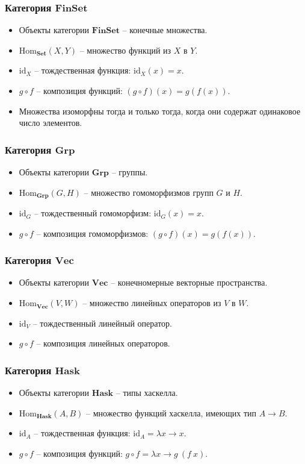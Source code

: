 \documentclass{beamer}
\newcommand{\cat}[1]{\mathbf{#1}}
\newcommand{\Set}{\cat{Set}}
\newcommand{\FinSet}{\cat{FinSet}}
\newcommand{\Grp}{\cat{Grp}}
\renewcommand{\Vec}{\cat{Vec}}
\newcommand{\Hask}{\cat{Hask}}
\newcommand{\fs}[1]{\mathrm{#1}}
\newcommand{\Hom}{\fs{Hom}}
\newcommand{\id}{\fs{id}}
\begin{document}
\begin{frame}
\frametitle{Категория $\FinSet$}
\begin{itemize}
\item Объекты категории $\FinSet$ -- конечные множества.
\item $\Hom_\Set(X, Y)$ -- множество функций из $X$ в $Y$.
\item $\id_X$ -- тождественная функция: $\id_X(x) = x$.
\item $g \circ f$ -- композиция функций: $(g \circ f)(x) = g(f(x))$.
\item Множества изоморфны тогда и только тогда, когда они содержат одинаковое число элементов.
\end{itemize}
\end{frame}

\begin{frame}
\frametitle{Категория $\Grp$}
\begin{itemize}
\item Объекты категории $\Grp$ -- группы.
\item $\Hom_\Grp(G, H)$ -- множество гомоморфизмов групп $G$ и $H$.
\item $\id_G$ -- тождественный гомоморфизм: $\id_G(x) = x$.
\item $g \circ f$ -- композиция гомоморфизмов: $(g \circ f)(x) = g(f(x))$.
\end{itemize}
\end{frame}

\begin{frame}
\frametitle{Категория $\Vec$}
\begin{itemize}
\item Объекты категории $\Vec$ -- конечномерные векторные пространства.
\item $\Hom_\Vec(V, W)$ -- множество линейных операторов из $V$ в $W$.
\item $\id_V$ -- тождественный линейный оператор.
\item $g \circ f$ -- композиция линейных операторов.
\end{itemize}
\end{frame}

\begin{frame}
\frametitle{Категория $\Hask$}
\begin{itemize}
\item Объекты категории $\Hask$ -- типы хаскелла.
\item $\Hom_\Hask(A, B)$ -- множество функций хаскелла, имеющих тип $A \to B$.
\item $\id_A$ -- тождественная функция: $\id_A = \lambda x \to x$.
\item $g \circ f$ -- композиция функций: $g \circ f = \lambda x \to g\ (f\ x)$.
\end{itemize}
\end{frame}
\end{document}
